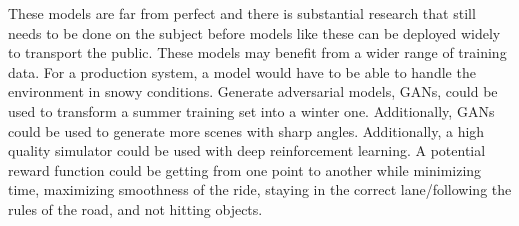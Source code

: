 \documentclass[10pt,twocolumn,letterpaper]{article}
\begin{document}
These models are far from perfect and there is substantial research that still needs to be done on the subject before models like these can be deployed widely to transport the public. These models may benefit from a wider range of training data. For a production system, a model would have to be able to handle the environment in snowy conditions. Generate adversarial models, GANs, could be used to transform a summer training set into a winter one. Additionally, GANs could be used to generate more scenes with sharp angles. Additionally, a high quality simulator could be used with deep reinforcement learning. A potential reward function could be getting from one point to another while minimizing time, maximizing smoothness of the ride, staying in the correct lane/following the rules of the road, and not hitting objects.




{\small


}
\end{document}
